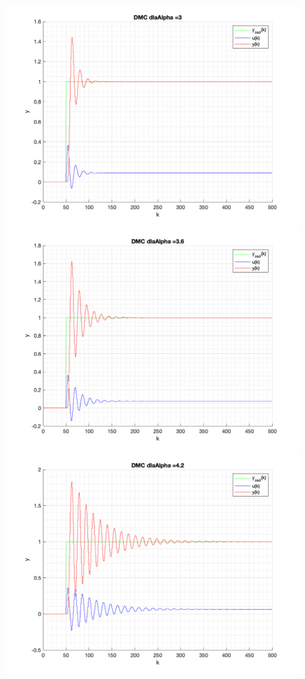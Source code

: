 \documentclass[a4paper, 11pt]{article}
\begin{document}
\begin{enumerate}
 \includegraphics[width=\linewidth]{./ModelsDodatkowe_Alpha/P4_DMC_Alpha_3_png.png} 
 \includegraphics[width=\linewidth]{./ModelsDodatkowe_Alpha/P4_DMC_Alpha_3_6_png.png} 
 \includegraphics[width=\linewidth]{./ModelsDodatkowe_Alpha/P4_DMC_Alpha_4_2_png.png} 

\end{enumerate}
\end{document}
